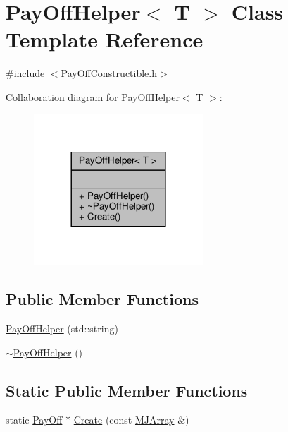 \hypertarget{classPayOffHelper}{}\section{Pay\+Off\+Helper$<$ T $>$ Class Template Reference}
\label{classPayOffHelper}


{\ttfamily \#include $<$Pay\+Off\+Constructible.\+h$>$}



Collaboration diagram for Pay\+Off\+Helper$<$ T $>$\+:
\nopagebreak
\begin{figure}[H]
\begin{center}
\leavevmode
\includegraphics[width=180pt]{classPayOffHelper__coll__graph}
\end{center}
\end{figure}
\subsection*{Public Member Functions}
\begin{DoxyCompactItemize}
\item 
\hyperlink{classPayOffHelper_ad2e199bb2484af9ecae7fc1f53b13e80}{Pay\+Off\+Helper} (std\+::string)
\item 
\hyperlink{classPayOffHelper_a7cb8349617e00ac901e38d60f5b77c94}{$\sim$\+Pay\+Off\+Helper} ()
\end{DoxyCompactItemize}
\subsection*{Static Public Member Functions}
\begin{DoxyCompactItemize}
\item 
static \hyperlink{classPayOff}{Pay\+Off} $\ast$ \hyperlink{classPayOffHelper_a794475ca98e3909feb3624a349233b1d}{Create} (const \hyperlink{classMJArray}{M\+J\+Array} \&)
\end{DoxyCompactItemize}


